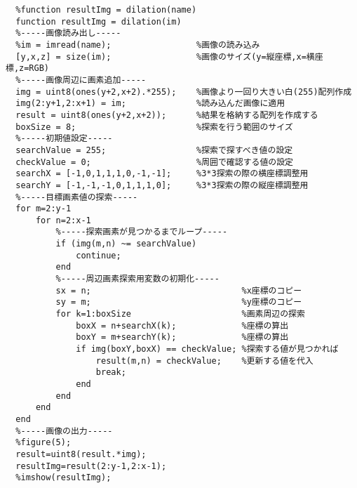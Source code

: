 \documentclass[a4j]{jarticle}
\begin{document}
\begin{verbatim}
  %function resultImg = dilation(name)
  function resultImg = dilation(im)
  %-----画像読み出し-----
  %im = imread(name);                 %画像の読み込み
  [y,x,z] = size(im);                 %画像のサイズ(y=縦座標,x=横座標,z=RGB)
  %-----画像周辺に画素追加-----
  img = uint8(ones(y+2,x+2).*255);    %画像より一回り大きい白(255)配列作成
  img(2:y+1,2:x+1) = im;              %読み込んだ画像に適用
  result = uint8(ones(y+2,x+2));      %結果を格納する配列を作成する
  boxSize = 8;                        %探索を行う範囲のサイズ
  %-----初期値設定-----
  searchValue = 255;                  %探索で探すべき値の設定
  checkValue = 0;                     %周囲で確認する値の設定
  searchX = [-1,0,1,1,1,0,-1,-1];     %3*3探索の際の横座標調整用
  searchY = [-1,-1,-1,0,1,1,1,0];     %3*3探索の際の縦座標調整用
  %-----目標画素値の探索-----
  for m=2:y-1
      for n=2:x-1
          %-----探索画素が見つかるまでループ-----
          if (img(m,n) ~= searchValue)
              continue;
          end
          %-----周辺画素探索用変数の初期化-----
          sx = n;                              %x座標のコピー
          sy = m;                              %y座標のコピー
          for k=1:boxSize                      %画素周辺の探索
              boxX = n+searchX(k);             %座標の算出
              boxY = m+searchY(k);             %座標の算出
              if img(boxY,boxX) == checkValue; %探索する値が見つかれば
                  result(m,n) = checkValue;    %更新する値を代入
                  break;
              end
          end
      end
  end
  %-----画像の出力-----
  %figure(5);
  result=uint8(result.*img);
  resultImg=result(2:y-1,2:x-1);
  %imshow(resultImg);
\end{verbatim}
\end{document}
